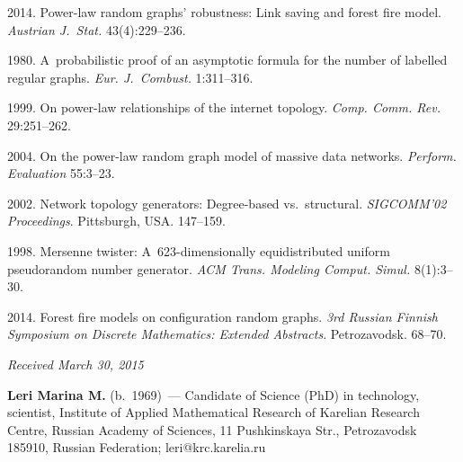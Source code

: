 \begin{multicols}{2}
{{\begin{thebibliography}{99}
 2014. Power-law random graphs' robustness:
Link saving and forest fire model. \textit{Austrian J.~Stat.} 43(4):229--236.

 1980. A~probabilistic proof of an asymptotic formula
for the number of labelled regular graphs. \textit{Eur. J.~Combust.} 1:311--316.

 1999. On power-law
relationships of the internet topology. \textit{Comp. Comm. Rev.}
29:251--262.

 2004. On the power-law random
graph model of massive data networks. \textit{Perform. Evaluation} 55:3--23.

2002. Network topology generators: Degree-based vs.\ structural.
\textit{SIGCOMM'02 Proceedings}.
Pittsburgh, USA. 147--159.

 1998. Mersenne twister: A~623-dimensionally
equidistributed uniform pseudorandom number generator.
\textit{ACM Trans. Modeling Comput. Simul.} 8(1):3--30.

 2014. Forest fire models on
configuration random graphs.
\textit{3rd Russian Finnish Symposium on
Discrete Mathematics: Extended Abstracts}. Pet\-ro\-za\-vodsk. 68--70.
\end{thebibliography}

 }
 }

\end{multicols}

\vspace*{-3pt}

\hfill{\small\textit{Received March 30, 2015}}

\Contrl


\noindent
\textbf{Leri Marina M.} (b.\ 1969)~---
  Candidate of Science (PhD) in technology,
  scientist, Institute of Applied Mathematical Research
  of Karelian Research Centre,
  Russian Academy of Sciences, 11 Pushkinskaya Str., Petrozavodsk 185910, Russian Federation; leri@krc.karelia.ru

\label{end\stat}


\renewcommand{\bibname}{\protect\rm Литература}